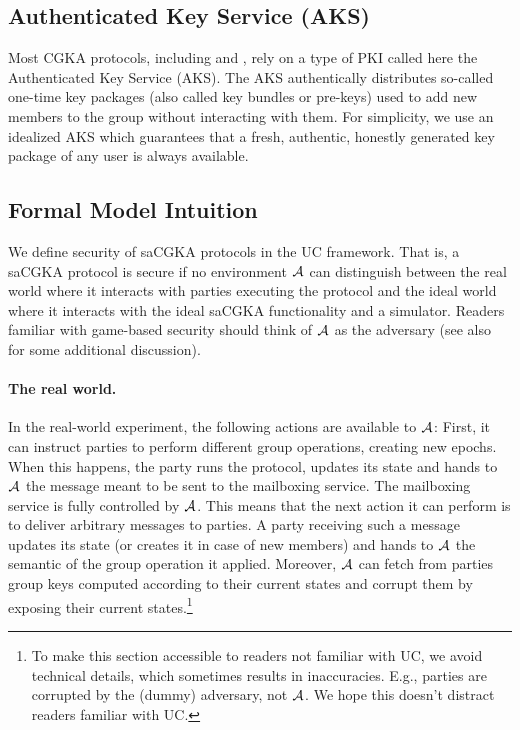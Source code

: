 \subsection{Authenticated Key Service (AKS)}
Most CGKA protocols, including \protITK and \saik, rely on a type of PKI called here the Authenticated Key Service (AKS). The AKS authentically distributes so-called one-time key packages (also called key bundles or pre-keys) used to add new members to the group without interacting with them. For simplicity, we use an idealized AKS which guarantees that a fresh, authentic, honestly generated key package of any user is always available.

\subsection{Formal Model Intuition}
We define security of saCGKA protocols in the UC framework. That is, a saCGKA protocol is secure if no environment $\mathcal{A}_{\relax}$ can distinguish between the real world where it interacts with parties executing the protocol and the ideal world where it interacts with the ideal saCGKA functionality and a simulator. Readers familiar with game-based security should think of $\mathcal{A}_{\relax}$ as the adversary (see also~\cite{EPRINT:AHKM21} for some additional discussion).

\paragraph{The real world.}
In the real-world experiment, the following actions are available to $\mathcal{A}_{\relax}$: First, it can instruct parties to perform
different group operations, creating new epochs. When this happens, the party runs the protocol, updates its state and
hands to $\mathcal{A}_{\relax}$ the message meant to be sent to the mailboxing service. The mailboxing service is fully controlled by
$\mathcal{A}_{\relax}$. This means that the next action it can perform is to deliver arbitrary messages to parties. A party receiving
such a message updates its state (or creates it in case of new members) and hands to $\mathcal{A}_{\relax}$ the semantic of the group operation it applied. Moreover, $\mathcal{A}_{\relax}$ can fetch from parties group keys computed according to their current states and corrupt them by exposing their current states.\footnote{To
	make this section accessible to readers not familiar with UC, we avoid technical details, which sometimes results in inaccuracies. E.g., parties are corrupted by the (dummy) adversary, not $\mathcal{A}_{\relax}$. We hope this doesn't distract readers familiar with UC.}


